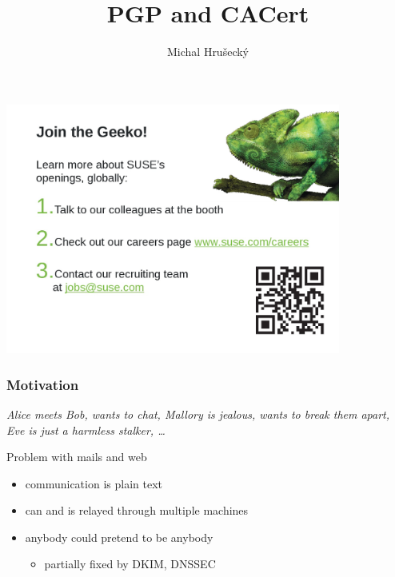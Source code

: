 \documentclass[xcolor={usenames,dvipsnames,svgnames}]{beamer}
\author{Michal Hru\v{s}eck\'{y}\newline {\small openSUSE Boosters}}
\title{PGP and CACert}
\begin{document}
\begin{frame}[t,plain]
\titlepage
\end{frame}


\begin{frame}
\includegraphics[width=11cm]{hiring}
\end{frame}

\begin{frame}[t]
   \frametitle{Motivation}
\vspace{.3cm}
   \textit{Alice meets Bob, wants to chat, Mallory is jealous, wants to break them apart, Eve is just a harmless stalker, \dots}
\pause

\vspace{.8cm}
   {\Large Problem with mails and web}
\vspace{.3cm}
   \begin{itemize}
       \item communication is plain text
       \item can and is relayed through multiple machines
       \item anybody could pretend to be anybody
       \begin{itemize}
           \item partially fixed by DKIM, DNSSEC
       \end{itemize}
   \end{itemize}
\vspace{.5cm}

\vspace{.3cm}
\end{frame}
\end{document}
